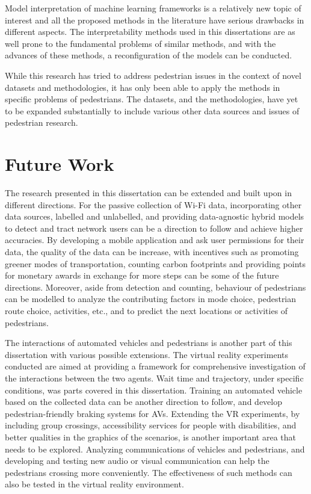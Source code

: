 Model interpretation of machine learning frameworks is a relatively new topic of interest and all the proposed methods in the literature have serious drawbacks in different aspects. The interpretability methods used in this dissertations are as well prone to the fundamental problems of similar methods, and with the advances of these methods, a reconfiguration of the models can be conducted. 

While this research has tried to address pedestrian issues in the context of novel datasets and methodologies, it has only been able to apply the methods in specific problems of pedestrians. The datasets, and the methodologies, have yet to be expanded substantially to include various other data sources and issues of pedestrian research.

\section{Future Work}
\label{chap7:sec3}
The research presented in this dissertation can be extended and built upon in different directions. For the passive collection of Wi-Fi data, incorporating other data sources, labelled and unlabelled, and providing data-agnostic hybrid models to detect and tract network users can be a direction to follow and achieve higher accuracies. By developing a mobile application and ask user permissions for their data, the quality of the data can be increase, with incentives such as promoting greener modes of transportation, counting carbon footprints and providing points for monetary awards in exchange for more steps can be some of the future directions. Moreover, aside from detection and counting, behaviour of pedestrians can be modelled to analyze the contributing factors in mode choice, pedestrian route choice, activities, etc., and to predict the next locations or activities of pedestrians.

The interactions of automated vehicles and pedestrians is another part of this dissertation with various possible extensions. The virtual reality experiments conducted are aimed at providing a framework for comprehensive investigation of the interactions between the two agents. Wait time and trajectory, under specific conditions, was parts covered in this dissertation. Training an automated vehicle based on the collected data can be another direction to follow, and develop pedestrian-friendly braking systems for AVs. Extending the VR experiments, by including group crossings, accessibility services for people with disabilities, and better qualities in the graphics of the scenarios, is another important area that needs to be explored. Analyzing communications of vehicles and pedestrians, and developing and testing new audio or visual communication can help the pedestrians crossing more conveniently. The effectiveness of such methods can also be tested in the virtual reality environment. 

